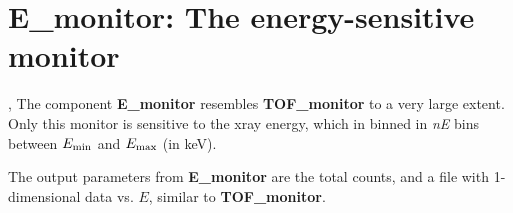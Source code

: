 \section{E\_monitor: The energy-sensitive monitor} \label{s:E_monitor}
,{}
The component {\bf E\_monitor} resembles {\bf TOF\_monitor}
to a very large extent. Only this monitor is sensitive to
the xray energy, which in binned in \textit{nE} bins between
$E_{\rm min}$ and $E_{\rm max}$ (in keV).

The output parameters from {\bf E\_monitor} are the total counts,
and a file with 1-dimensional data vs. $E$, similar to {\bf TOF\_monitor}.


